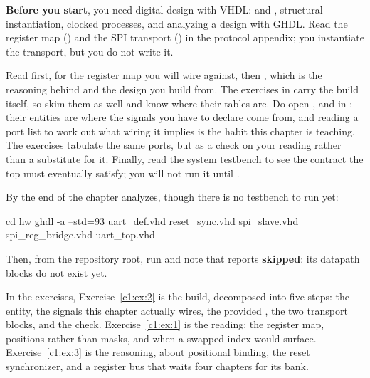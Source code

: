 \textbf{Before you start}, you need digital design with VHDL:  and
, structural instantiation, clocked processes, and analyzing a design with GHDL.
Read the register map () and the SPI transport () in the
protocol appendix; you instantiate the transport, but you do not write it.

Read  first, for the register map you will wire against, then
, which is the reasoning behind  and the design you build
from. The exercises in  carry the build itself, so skim them as well and
know where their tables are. Do open ,  and
 in : their entities are where the signals you have to declare
come from, and reading a port list to work out what wiring it implies is the habit this chapter is
teaching. The exercises tabulate the same ports, but as a check on your reading rather than a
substitute for it. Finally, read the system testbench  to see the contract the
top must eventually satisfy; you will not run it until .

By the end of the chapter  analyzes, though there is no testbench to run yet:

\begin{shell}
cd hw
ghdl -a --std=93 uart_def.vhd reset_sync.vhd spi_slave.vhd spi_reg_bridge.vhd uart_top.vhd
\end{shell}

\noindent Then, from the repository root, run  and note that
 reports \textbf{skipped}: its datapath blocks do not exist yet.

In the exercises, Exercise~\ref{c1:ex:2} is the build, decomposed into five steps: the entity, the
signals this chapter actually wires, the provided , the two transport blocks, and
the check. Exercise~\ref{c1:ex:1} is the reading: the register map, positions rather than masks, and
when a swapped index would surface. Exercise~\ref{c1:ex:3} is the reasoning, about positional
binding, the reset synchronizer, and a register bus that waits four chapters for its bank.





